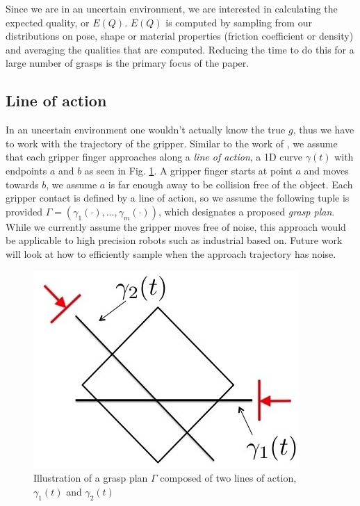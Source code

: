\documentclass[letterpaper, 10 pt, conference]{ieeeconf}  %
\begin{document}
Since we are in an uncertain environment, we are interested in calculating the expected quality, or $E(Q)$. $E(Q)$ is computed by sampling from our distributions on pose, shape or material properties (friction coefficient or density) and averaging the qualities that are computed. Reducing the time to do this for a large number of grasps is the primary focus of the paper. 

\subsection{Line of action}
In an uncertain environment one wouldn't actually know the true $g$, thus we have to work with the trajectory of the gripper. Similar to the work of \cite{christopoulos2007handling}, we assume that each gripper finger approaches along a \textit{line of action}, a 1D curve $\gamma(t)$ with endpoints $a$ and $b$ as seen in Fig. \ref{fig:line_of_action}.
A gripper finger starts at point $a$ and moves towards $b$, we assume $a$ is far enough away to be collision free of the object.
Each gripper contact is defined by a line of action, so we assume the following tuple is provided $\Gamma = ( \gamma_1(\cdot),...,\gamma_m(\cdot) )$, which designates a proposed \textit{grasp plan}.
While we currently assume the gripper moves free of noise, this approach would be applicable to high precision robots such as industrial based on. 
Future work will look at how to efficiently sample when the approach trajectory has noise. 

\begin{figure}[ht!]
\centering
\includegraphics[scale = 0.3]{figures/Slide01.jpg}
\caption{Illustration of a grasp plan $\Gamma$ composed of two lines of action, $\gamma_1(t)$ and $\gamma_2(t)$}
\vspace*{-10pt}
\label{fig:line_of_action}
\end{figure}
\end{document}
